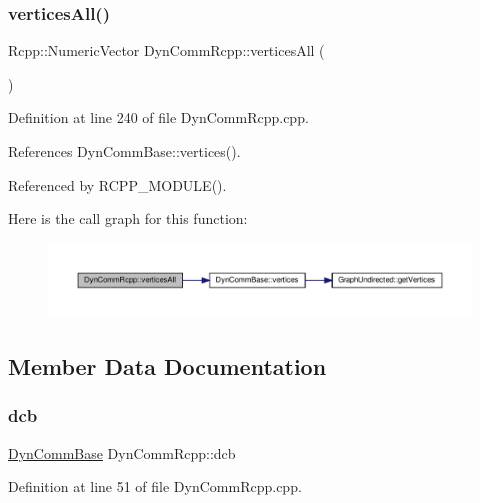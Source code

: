 \subsubsection{\texorpdfstring{vertices\+All()}{verticesAll()}}
{\footnotesize\ttfamily Rcpp\+::\+Numeric\+Vector Dyn\+Comm\+Rcpp\+::vertices\+All (\begin{DoxyParamCaption}{ }\end{DoxyParamCaption})\hspace{0.3cm}{\ttfamily [inline]}}



Definition at line 240 of file Dyn\+Comm\+Rcpp.\+cpp.



References Dyn\+Comm\+Base\+::vertices().



Referenced by R\+C\+P\+P\+\_\+\+M\+O\+D\+U\+L\+E().

Here is the call graph for this function\+:
\nopagebreak
\begin{figure}[H]
\begin{center}
\leavevmode
\includegraphics[width=350pt]{classDynCommRcpp_aa2aa3fe8c7af4239bd9b3c6a669329ec_cgraph}
\end{center}
\end{figure}


\subsection{Member Data Documentation}
\mbox{\label{classDynCommRcpp_a29aa77f1324fd9891a67feedea880961}} 
\subsubsection{\texorpdfstring{dcb}{dcb}}
{\footnotesize\ttfamily \hyperlink{classDynCommBase}{Dyn\+Comm\+Base} Dyn\+Comm\+Rcpp\+::dcb\hspace{0.3cm}{\ttfamily [private]}}



Definition at line 51 of file Dyn\+Comm\+Rcpp.\+cpp.

